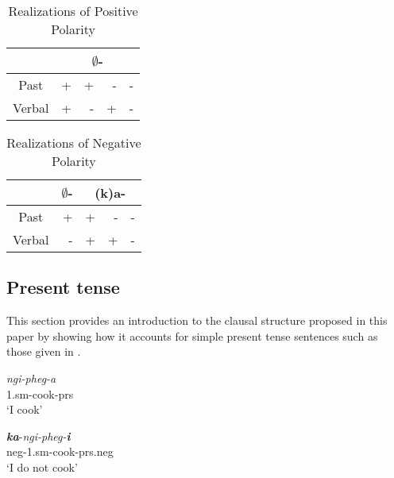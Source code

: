 \documentclass[output=paper]{langsci/langscibook}
\begin{document}
\begin{table}
\caption{Realizations of Positive Polarity} %
\centering %
\begin{tabular}{c| rrrr} %
\hline %
  &\multicolumn{4}{c}{$\emptyset$-} \\ [0.5ex] 
\hline %
Past & + & + & - & -\\ %
Verbal & + & - & +& -\\[1ex] %
\hline %
\end{tabular} 
\label{tab:hresult} 
\end{table} 

\begin{table}
\caption{Realizations of Negative Polarity} %
\centering %
\begin{tabular}{c| r|rrr} %
\hline %
 &\multicolumn{1}{c}{$\emptyset$-} &\multicolumn{3}{|c}{(k)a-} \\ [0.5ex] 
\hline %
Past & + & + & - & -\\ %
Verbal & - & + & +& -\\[1ex] %
\hline %
\end{tabular} 
\label{tab:hresult} 
\end{table} 






\subsection{Present tense}

This section provides an introduction to the clausal structure proposed in this paper by showing how it accounts for simple present tense sentences such as those given in .
 

\begin{exe}
\ex \begin{xlist}
\ex \gll  \textit{ngi-pheg-a}\\
          1.{\sc sm}-cook-\sc prs\\
    \glt `I cook'





\ex \gll  \textit{\textbf{ka}}-\textit{ngi-pheg-\textbf{i}}\\
          {\sc neg}-1.{\sc sm}-cook-{\sc prs.neg}\\
    \glt `I do not cook'
\end{xlist}
\end{exe}
 
\end{document}
